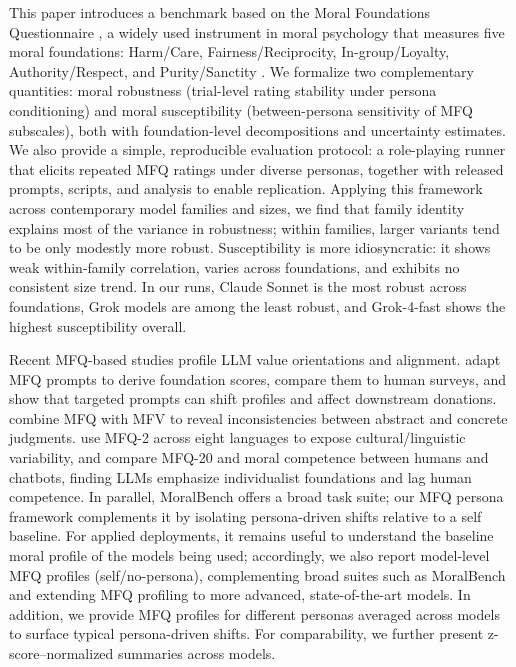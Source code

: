 \documentclass{article}
\begin{document}
This paper introduces a benchmark based on the Moral Foundations Questionnaire \citep{moralfoundations2017questionnaires}, a widely used instrument in moral psychology that measures five moral foundations: Harm/Care, Fairness/Reciprocity, In-group/Loyalty, Authority/Respect, and Purity/Sanctity \citep{graham2009liberals,haidt2007when,moralfoundations2017questionnaires}. We formalize two complementary quantities: moral robustness (trial-level rating stability under persona conditioning) and moral susceptibility (between-persona sensitivity of MFQ subscales), both with foundation-level decompositions and uncertainty estimates. We also provide a simple, reproducible evaluation protocol: a role-playing runner that elicits repeated MFQ ratings under diverse personas, together with released prompts, scripts, and analysis to enable replication. Applying this framework across contemporary model families and sizes, we find that family identity explains most of the variance in robustness; within families, larger variants tend to be only modestly more robust. Susceptibility is more idiosyncratic: it shows weak within-family correlation, varies across foundations, and exhibits no consistent size trend. In our runs, Claude Sonnet is the most robust across foundations, Grok models are among the least robust, and Grok-4-fast shows the highest susceptibility overall.

Recent MFQ-based studies profile LLM value orientations and alignment. \citet{abdulhai-etal-2024-moral} adapt MFQ prompts to derive foundation scores, compare them to human surveys, and show that targeted prompts can shift profiles and affect downstream donations. \citet{nunes2024hypocrites} combine MFQ with MFV to reveal inconsistencies between abstract and concrete judgments. \citet{aksoy2024whose} use MFQ-2 across eight languages to expose cultural/linguistic variability, and \citet{bajpai2024insights} compare MFQ-20 and moral competence between humans and chatbots, finding LLMs emphasize individualist foundations and lag human competence. In parallel, MoralBench \citep{ji2025moralbenchmoralevaluationllms} offers a broad task suite; our MFQ persona framework complements it by isolating persona-driven shifts relative to a self baseline. For applied deployments, it remains useful to understand the baseline moral profile of the models being used; accordingly, we also report model-level MFQ profiles (self/no-persona), complementing broad suites such as MoralBench and extending MFQ profiling to more advanced, state-of-the-art models. In addition, we provide MFQ profiles for different personas averaged across models to surface typical persona-driven shifts. For comparability, we further present z-score–normalized summaries across models.
\end{document}
